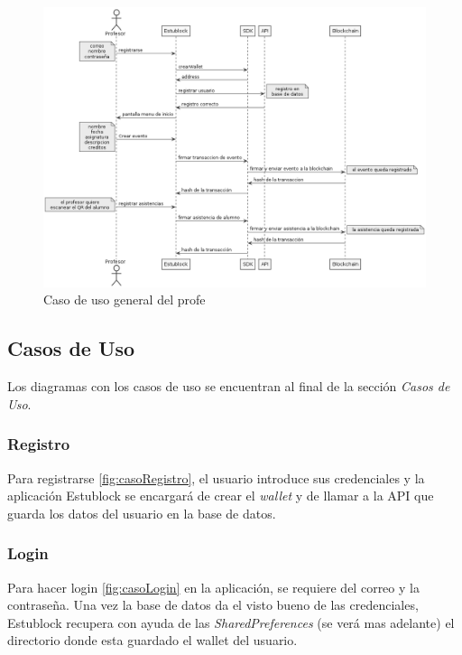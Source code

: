 \begin{landscape}
\begin{figure}[h!]
  \centering
  \includegraphics[scale=0.5]{figs/Desarrollo/CasosUso/generalProfe}
  \caption[Caso de uso general del profe]{Caso de uso general del profe}
  \label{fig:uso_profe}
\end{figure}
\end{landscape}

\clearpage
\subsection{Casos de Uso}
\label{sec:casosUso}

Los diagramas con los casos de uso se encuentran al final de la sección \emph{Casos de Uso}.

\subsubsection{Registro}

Para registrarse \ref{fig:casoRegistro}, el usuario introduce sus credenciales y la aplicación Estublock se encargará de crear el \emph{wallet} y de llamar a la API que guarda los datos del usuario en la base de datos.

\subsubsection{Login}

Para hacer login \ref{fig:casoLogin} en la aplicación, se requiere del correo y la contraseña. Una vez la base de datos da el visto bueno de las credenciales, Estublock recupera con ayuda de las \emph{SharedPreferences} (se verá mas adelante) el directorio donde esta guardado el wallet del usuario.

